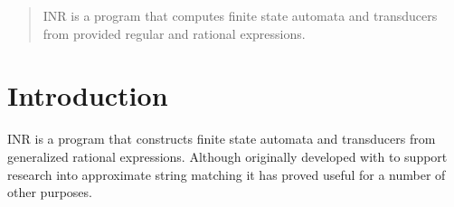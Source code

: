 \maketitle
\begin{abstract}
INR is a program that computes finite state automata and transducers from
provided regular and rational expressions.
\end{abstract}

\section{Introduction}
INR is a program that constructs finite state automata and transducers from
generalized rational expressions.
Although originally developed with to support research into
approximate string matching \cite{Johnson83} it has proved useful for a
number of other purposes.

